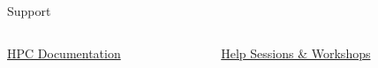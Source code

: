 \documentclass[aspectratio=169]{beamer}
\begin{document}
\begin{frame}{Support}
\small
\begin{columns}[t]
\begin{column}{0.5\textwidth}
\href{https://southernmethodistuniversity.github.io/hpc\_docs/}{HPC Documentation}\newline\newline
{}
\end{column}
\begin{column}{0.5\textwidth}
\href{https://libcal.smu.edu}{Help Sessions \& Workshops}\newline\newline
{}
\end{column}
\end{columns}
\end{frame}
\end{document}
